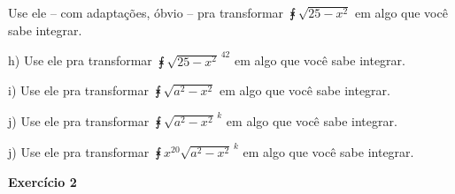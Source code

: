 \documentclass[oneside,12pt]{article}
\begin{document}
{{Use ele -- com adaptações, óbvio -- pra transformar
$\intx{\sqrt{25-x^2}}$ em algo que você sabe integrar.

\ssk

h) Use ele pra transformar
$\intx{\sqrt{25-x^2}^{\,42}}$ em algo que você sabe integrar.

\ssk

i) Use ele pra transformar $\intx{\sqrt{a^2-x^2}}$ em algo que você
sabe integrar.

\ssk

j) Use ele pra transformar
$\intx{\sqrt{a^2-x^2}^{\,k}}$ em algo que você sabe integrar.

\ssk

j) Use ele pra transformar $\intx{x^{20} \sqrt{a^2-x^2}^{\,k}}$ em
algo que você sabe integrar.


}}



\newpage

{\bf Exercício 2}

\end{document}
